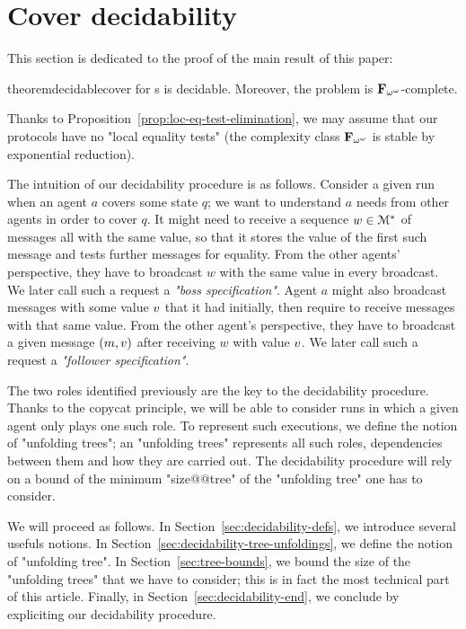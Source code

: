 \section{Cover decidability}
\label{sec:cover-decidability}

This section is dedicated to the proof of the main result of this paper:

\begin{restatable}{theorem}{decidablecover}
\label{thm:decidable-cover}
\COVER for \BNRA{}s is decidable. Moreover, the problem is $\mathbf{F}_{\omega^\omega}$-complete.
\end{restatable}

Thanks to Proposition~\ref{prop:loc-eq-test-elimination}, we may assume that our protocols have no "local equality tests" (the complexity class $\mathbf{F}_{\omega^{\omega}}$ is stable by exponential reduction). 

The intuition of our decidability procedure is as follows. 
Consider a given run when an agent $a$ covers some state $q$; we want to understand $a$ needs from other agents in order to cover $q$. It might need to receive a sequence $w \in \mathcal{M}^*$ of messages all with the same value, so that it stores the value of the first such message and tests further messages for equality.
From the other agents' perspective, they have to broadcast $w$ with the same value in every broadcast. We later call such a request a \emph{"boss specification"}.  
Agent $a$ might also broadcast messages with some value $v$ that it had initially, then require to receive messages with that same value. 
From the other agent's perspective, they have to broadcast a given message $(m,v)$ after receiving $w$ with value $v$. We later call such a request a \emph{"follower specification"}.

The two roles identified previously are the key to the decidability procedure. Thanks to the copycat principle, we will be able to consider runs in which a given agent only plays one such role. To represent such executions, we define the notion of "unfolding trees"; an "unfolding trees" represents all such roles, dependencies between them and how they are carried out. The decidability procedure will rely on a bound of the minimum "size@@tree" of the "unfolding tree" one has to consider.

We will proceed as follows. In Section~\ref{sec:decidability-defs}, we introduce several usefuls notions. In Section~\ref{sec:decidability-tree-unfoldings}, we define the notion of "unfolding tree". In Section~\ref{sec:tree-bounds}, we bound the size of the "unfolding trees" that we have to consider; this is in fact the most technical part of this article. Finally, in Section~\ref{sec:decidability-end}, we conclude by expliciting our decidability procedure. 


